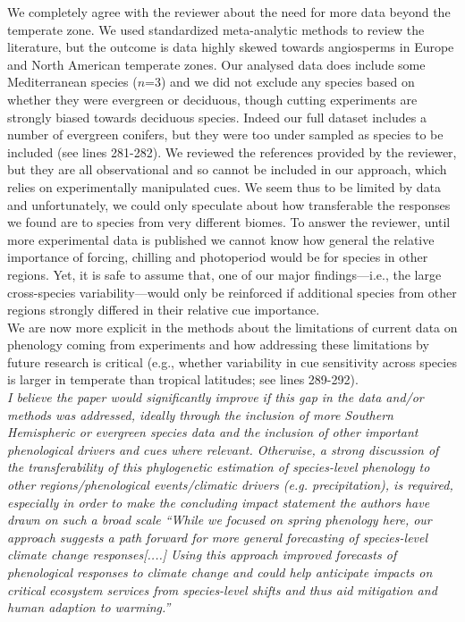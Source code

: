 \documentclass[11pt]{article}
\begin{document}
We completely agree with the reviewer about the need for more data beyond the temperate zone. We used standardized meta-analytic methods to review the literature, but the outcome is data highly skewed towards angiosperms in Europe and North American temperate zones. Our analysed data does include some Mediterranean species ($n$=3) and we did not exclude any species based on whether they were evergreen or deciduous, though cutting experiments are strongly biased towards deciduous species. Indeed our full dataset includes a number of evergreen conifers, but they were too under sampled as species to be included (see lines 281-282). We reviewed the references provided by the reviewer, but they are all observational and so cannot be included in our approach, which relies on experimentally manipulated cues. We seem thus to be limited by data and unfortunately, we could only speculate about how transferable the responses we found are to species from very different biomes. To answer the reviewer, until more experimental data is published we cannot know how general the relative importance of forcing, chilling and photoperiod would be for species in other regions. Yet, it is safe to assume that, one of our major findings---i.e., the large cross-species variability---would only be reinforced if additional species from other regions strongly differed in their relative cue importance.\\

We are now more explicit in the methods about the limitations of current data on phenology coming from experiments and how addressing these limitations by future research is critical (e.g., whether variability in cue sensitivity across species is larger in temperate than tropical latitudes; see lines 289-292). \\


\emph{I believe the paper would significantly improve if this gap in the data and/or methods was addressed, ideally through the inclusion of more Southern Hemispheric or evergreen species data and the inclusion of other important phenological drivers and cues where relevant. Otherwise, a strong discussion of the transferability of this phylogenetic estimation of species-level phenology to other regions/phenological events/climatic drivers (e.g. precipitation), is required, especially in order to make the concluding impact statement the authors have drawn on such a broad scale “While we focused on spring phenology here, our approach suggests a path forward for more general forecasting of species-level climate change responses[....] Using this approach improved forecasts of phenological responses to climate change and could help anticipate impacts on critical ecosystem services from species-level shifts and thus aid mitigation and human adaption to warming.”}\\
\end{document}
